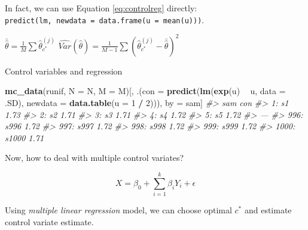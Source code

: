 \documentclass[]{book}
\newenvironment{Shaded}{\begin{snugshade}}{\end{snugshade}}
\newcommand{\CommentTok}[1]{\textcolor[rgb]{0.56,0.35,0.01}{\textit{#1}}}
\newcommand{\DataTypeTok}[1]{\textcolor[rgb]{0.13,0.29,0.53}{#1}}
\newcommand{\DecValTok}[1]{\textcolor[rgb]{0.00,0.00,0.81}{#1}}
\newcommand{\KeywordTok}[1]{\textcolor[rgb]{0.13,0.29,0.53}{\textbf{#1}}}
\newcommand{\NormalTok}[1]{#1}
\newcommand{\OperatorTok}[1]{\textcolor[rgb]{0.81,0.36,0.00}{\textbf{#1}}}
\newcommand{\StringTok}[1]{\textcolor[rgb]{0.31,0.60,0.02}{#1}}
\theoremstyle{definition}
\theoremstyle{definition}
\theoremstyle{definition}
\theoremstyle{remark}
\begin{document}
In fact, we can use Equation \eqref{eq:controlreg} directly: \texttt{predict(lm,\ newdata\ =\ data.frame(u\ =\ mean(u)))}.

\begin{algorithm}[H] \label{alg:algconreg}
  \SetAlgoLined
  $\bar{\hat\theta} = \frac{1}{M} \sum \hat\theta_{c^{\ast}}^{(j)}$\;
  $\widehat{Var}(\hat\theta) = \frac{1}{M - 1} \sum (\hat\theta_{c^{\ast}}^{(j)} - \bar{\hat\theta})^2$\;
  \caption{Control variables and regression}
\end{algorithm}

\begin{Shaded}
\begin{Highlighting}[]
\KeywordTok{mc_data}\NormalTok{(runif, }\DataTypeTok{N =}\NormalTok{ N, }\DataTypeTok{M =}\NormalTok{ M)[,}
\NormalTok{                             .(}\DataTypeTok{con =} \KeywordTok{predict}\NormalTok{(}\KeywordTok{lm}\NormalTok{(}\KeywordTok{exp}\NormalTok{(u) }\OperatorTok{~}\StringTok{ }\NormalTok{u, }\DataTypeTok{data =}\NormalTok{ .SD), }
                                             \DataTypeTok{newdata =} \KeywordTok{data.table}\NormalTok{(}\DataTypeTok{u =} \DecValTok{1} \OperatorTok{/}\StringTok{ }\DecValTok{2}\NormalTok{))),}
\NormalTok{                             by =}\StringTok{ }\NormalTok{sam]}
\CommentTok{#>         sam  con}
\CommentTok{#>    1:    s1 1.73}
\CommentTok{#>    2:    s2 1.71}
\CommentTok{#>    3:    s3 1.71}
\CommentTok{#>    4:    s4 1.72}
\CommentTok{#>    5:    s5 1.72}
\CommentTok{#>   ---           }
\CommentTok{#>  996:  s996 1.72}
\CommentTok{#>  997:  s997 1.72}
\CommentTok{#>  998:  s998 1.72}
\CommentTok{#>  999:  s999 1.72}
\CommentTok{#> 1000: s1000 1.71}
\end{Highlighting}
\end{Shaded}

Now, how to deal with multiple control variates?

\[X = \beta_0 + \sum_{i = 1}^k \beta_i Y_i + \epsilon\]

Using \emph{multiple linear regression} model, we can choose optimal \(c^{\ast}\) and estimate control variate estimate.
\end{document}
